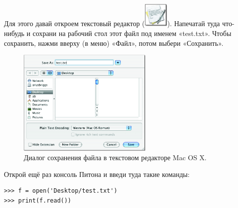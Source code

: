 \begin{MAC}
	
Для этого давай откроем текстовый редактор (\includegraphics*[width=12mm]{../en/textedit-icon.eps}). Напечатай туда что-нибудь и сохрани на рабочий стол этот файл под именем «test.txt». Чтобы сохранить, нажми вверху (в меню) «Файл», потом выбери «Сохранить».

\begin{figure}
\begin{center}
\includegraphics[width=65mm]{../en/figure18.eps}
\end{center}
\caption{Диалог сохранения файла в текстовом редакторе Mac OS X.}\label{fig18}
\end{figure}

Открой ещё раз консоль Питона и введи туда такие команды:

\begin{listing}
\begin{verbatim}
>>> f = open('Desktop/test.txt')
>>> print(f.read())
\end{verbatim}
\end{listing}
\end{MAC}

